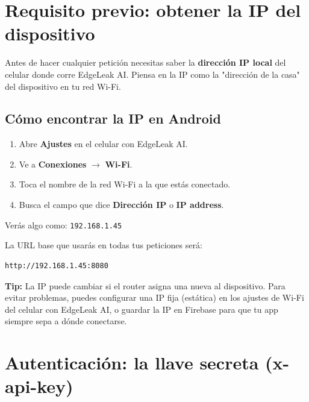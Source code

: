 \documentclass[12pt, a4paper]{article}
\begin{document}
\section{Requisito previo: obtener la IP del dispositivo}

Antes de hacer cualquier petición necesitas saber la \textbf{dirección IP local}
del celular donde corre EdgeLeak AI. Piensa en la IP como la "dirección de la
casa" del dispositivo en tu red Wi-Fi.

\subsection{Cómo encontrar la IP en Android}

\begin{enumerate}[leftmargin=*, label=\arabic*.)]
  \item Abre \textbf{Ajustes} en el celular con EdgeLeak AI.
  \item Ve a \textbf{Conexiones} $\rightarrow$ \textbf{Wi-Fi}.
  \item Toca el nombre de la red Wi-Fi a la que estás conectado.
  \item Busca el campo que dice \textbf{Dirección IP} o \textbf{IP address}.
\end{enumerate}

Verás algo como: \texttt{192.168.1.45}

La URL base que usarás en todas tus peticiones será:

\begin{lstlisting}[style=httpStyle]
http://192.168.1.45:8080
\end{lstlisting}

\begin{tcolorbox}[infobox]
  \textbf{Tip:} La IP puede cambiar si el router asigna una nueva al dispositivo.
  Para evitar problemas, puedes configurar una IP fija (estática) en los ajustes
  de Wi-Fi del celular con EdgeLeak AI, o guardar la IP en Firebase para que tu
  app siempre sepa a dónde conectarse.
\end{tcolorbox}

\section{Autenticación: la llave secreta (x-api-key)}
\end{document}
